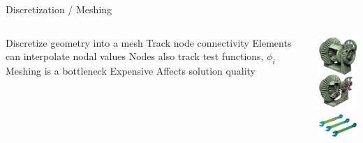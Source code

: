 \placelogofalse
\begin{frame}{Discretization / Meshing}
\begin{columns}
\centering
\begin{outline}
  \1 Discretize geometry into a mesh
  \1 Track node connectivity
  \1 Elements can interpolate nodal values 
  \1 Nodes also track test functions, $\phi_i$
  \1 Meshing is a bottleneck
  \2 Expensive
  \2 Affects solution quality
\end{outline}

\begin{center}
\includegraphics[width=2.5cm]{mesh_example_01.png}\\

\includegraphics[width=4.0cm]{mesh_example_02.png}\\
\end{center}
\end{columns}
\end{frame}
\placelogotrue


